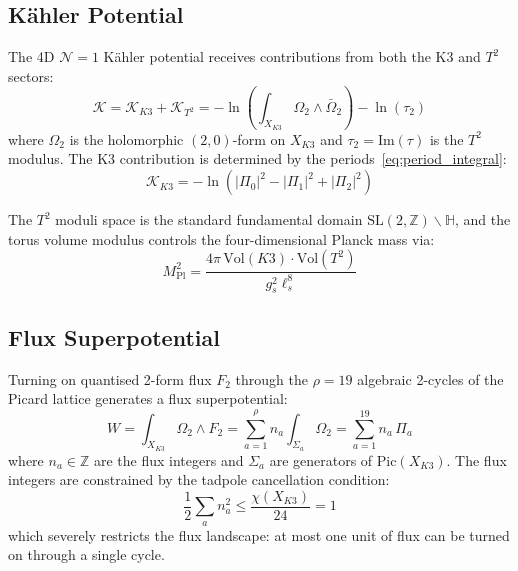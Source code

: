 \subsection{K\"ahler Potential}
\label{subsec:kahler}

The 4D $\mathcal{N}=1$ K\"ahler potential receives contributions from both the K3 and $T^2$ sectors:
\begin{equation}
    \mathcal{K} = \mathcal{K}_{K3} + \mathcal{K}_{T^2} = -\ln\left(\int_{X_{K3}} \Omega_2 \wedge \bar{\Omega}_2 \right) - \ln\left(\tau_2\right)
    \label{eq:kahler_potential}
\end{equation}
where $\Omega_2$ is the holomorphic $(2,0)$-form on $X_{K3}$ and $\tau_2 = \text{Im}(\tau)$ is the $T^2$ modulus.  The K3 contribution is determined by the periods~\eqref{eq:period_integral}:
\begin{equation}
    \mathcal{K}_{K3} = -\ln\left(|\Pi_0|^2 - |\Pi_1|^2 + |\Pi_2|^2\right)
\end{equation}

The $T^2$ moduli space is the standard fundamental domain $\text{SL}(2,\mathbb{Z})\backslash\mathbb{H}$, and the torus volume modulus controls the four-dimensional Planck mass via:
\begin{equation}
    M_{\text{Pl}}^2 = \frac{4\pi \, \text{Vol}(K3) \cdot \text{Vol}(T^2)}{g_s^2 \ell_s^8}
\end{equation}

\subsection{Flux Superpotential}
\label{subsec:superpotential}

Turning on quantised 2-form flux $F_2$ through the $\rho = 19$ algebraic 2-cycles of the Picard lattice generates a flux superpotential:
\begin{equation}
    W = \int_{X_{K3}} \Omega_2 \wedge F_2 = \sum_{a=1}^{\rho} n_a \int_{\Sigma_a} \Omega_2 = \sum_{a=1}^{19} n_a \, \Pi_a
    \label{eq:superpotential}
\end{equation}
where $n_a \in \mathbb{Z}$ are the flux integers and $\Sigma_a$ are generators of $\text{Pic}(X_{K3})$.  The flux integers are constrained by the tadpole cancellation condition:
\begin{equation}
    \frac{1}{2} \sum_{a} n_a^2 \leq \frac{\chi(X_{K3})}{24} = 1
\end{equation}
which severely restricts the flux landscape: at most one unit of flux can be turned on through a single cycle.

